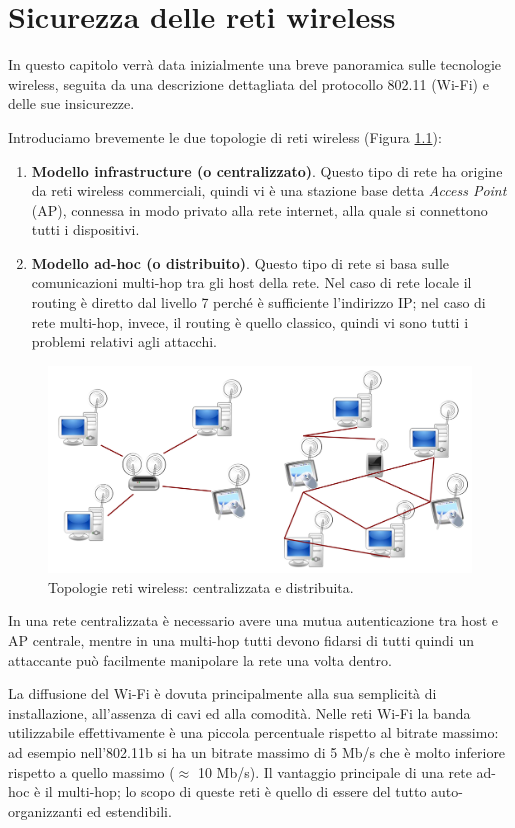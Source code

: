 \chapter{Sicurezza delle reti wireless}
In questo capitolo verrà data inizialmente una breve panoramica sulle tecnologie wireless, seguita da una descrizione dettagliata del protocollo 802.11 (Wi-Fi) e delle sue insicurezze.

Introduciamo brevemente le due topologie di reti wireless (Figura \ref{img:wireless-topology}):
\begin{enumerate}
	\item \textbf{Modello infrastructure (o centralizzato)}. Questo tipo di rete ha origine da reti wireless commerciali, quindi vi è una stazione base detta \textit{Access Point} (AP), connessa in modo privato alla rete internet, alla quale si connettono tutti i dispositivi.
	\item \textbf{Modello ad-hoc (o distribuito)}. Questo tipo di rete si basa sulle comunicazioni multi-hop tra gli host della rete. Nel caso di rete locale il routing è diretto dal livello 7 perché è sufficiente l'indirizzo IP; nel caso di rete multi-hop, invece, il routing è quello classico, quindi vi sono tutti i problemi relativi agli attacchi.
\end{enumerate}
\begin{figure}[htbp]
	\centering
	\includegraphics[scale = 0.4]{images/wireless-topology}
	\caption{Topologie reti wireless: centralizzata e distribuita.}
	\label{img:wireless-topology}
\end{figure}
In una rete centralizzata è necessario avere una mutua autenticazione tra host e AP centrale, mentre in una multi-hop tutti devono fidarsi di tutti quindi un attaccante può facilmente manipolare la rete una volta dentro.

La diffusione del Wi-Fi è dovuta principalmente alla sua semplicità di installazione, all'assenza di cavi ed alla comodità. Nelle reti Wi-Fi la banda utilizzabile effettivamente è una piccola percentuale rispetto al bitrate massimo: ad esempio nell'802.11b si ha un bitrate massimo di 5 Mb/s che è molto inferiore rispetto a quello massimo ($\approx$ 10 Mb/s). Il vantaggio principale di una rete ad-hoc è il multi-hop; lo scopo di queste reti è quello di essere del tutto auto-organizzanti ed estendibili.

